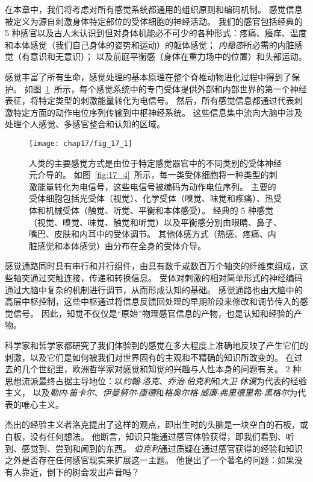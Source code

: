 在本章中，我们将考虑对所有感觉系统都通用的组织原则和编码机制。 
感觉信息被定义为源自刺激身体特定部位的受体细胞的神经活动。 
我们的感官包括经典的 5 种感官以及古人未认识到但对身体机能必不可少的各种形式：疼痛、瘙痒、温度和本体感觉（我们自己身体的姿势和运动）的躯体感觉；
\textit{内稳态}所必需的内脏感觉（有意识和无意识）； 
以及前庭平衡感（身体在重力场中的位置）和头部运动。


感觉丰富了所有生命，感觉处理的基本原理在整个脊椎动物进化过程中得到了保护。
如图~\ref{fig:17_1}~所示，每个感觉系统中的专门受体提供外部和内部世界的第一个神经表征，将特定类型的刺激能量转化为电信号。
然后，所有感觉信息都通过代表刺激特定方面的动作电位序列传输到中枢神经系统。
这些信息集中流向大脑中涉及处理个人感觉、多感官整合和认知的区域。


\begin{figure}[htbp]
	\centering
	\texttt{[image: chap17/fig\_17\_1]}
	\caption{人类的主要感觉方式是由位于特定感觉器官中的不同类别的受体神经元介导的。 
		如图~\ref{fig:17_4}~所示，每一类受体细胞将一种类型的刺激能量转化为电信号，这些电信号被编码为动作电位序列。
		主要的受体细胞包括光受体（视觉）、化学受体（嗅觉、味觉和疼痛）、热受体和机械受体（触觉、听觉、平衡和本体感受）。 
		经典的 5 种感觉（视觉、嗅觉、味觉、触觉和听觉）以及平衡感分别由眼睛、鼻子、嘴巴、皮肤和内耳中的受体调节。
		其他体感方式（热感、疼痛、内脏感觉和本体感觉）由分布在全身的受体介导。}
	\label{fig:17_1}
\end{figure}



感觉通路同时具有串行和并行组件，由具有数千或数百万个轴突的纤维束组成，这些轴突通过突触连接，传递和转换信息。 
受体对刺激的相对简单形式的神经编码通过大脑中复杂的机制进行调节，从而形成认知的基础。 
感觉通路也由大脑中的高层中枢控制，这些中枢通过将信息反馈回处理的早期阶段来修改和调节传入的感觉信号。 
因此，知觉不仅仅是“原始”物理感官信息的产物，也是认知和经验的产物。


科学家和哲学家都研究了我们体验到的感觉在多大程度上准确地反映了产生它们的刺激，以及它们是如何被我们对世界固有的主观和不精确的知识所改变的。 
在过去的几个世纪里，欧洲哲学家对感觉和知觉的兴趣与人性本身的问题有关。 
2 种思想流派最终占据主导地位：以\textit{约翰$\cdot$洛克}、\textit{乔治$\cdot$伯克利}和\textit{大卫$\cdot$休谟}为代表的经验主义，
以及\textit{勒内$\cdot$笛卡尔}、\textit{伊曼努尔$\cdot$康德}和\textit{格奥尔格$\cdot$威廉$\cdot$弗里德里希$\cdot$黑格尔}为代表的唯心主义。


杰出的经验主义者洛克提出了这样的观点，即出生时的头脑是一块空白的石板，或白板，没有任何想法。
他断言，知识只能通过感官体验获得，即我们看到、听到、感觉到、尝到和闻到的东西。
\textit{伯克利}通过质疑在通过感官获得的经验和知识之外是否存在任何感官现实来扩展这一主题。
他提出了一个著名的问题：如果没有人靠近，倒下的树会发出声音吗？


